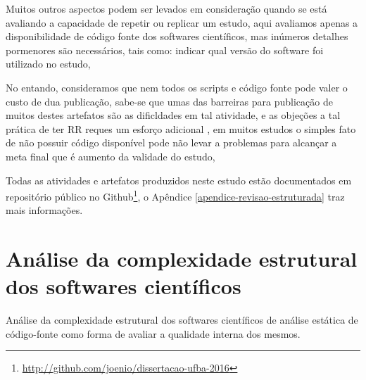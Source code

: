 
Muitos outros aspectos podem ser levados em consideração quando se está
avaliando a capacidade de repetir ou replicar um estudo, aqui avaliamos apenas
a disponibilidade de código fonte dos softwares científicos, mas inúmeros detalhes
pormenores são necessários, tais como: indicar qual versão do software foi
utilizado no estudo, 

No entando, consideramos que nem todos os scripts e código fonte pode
valer o custo de dua publicação, sabe-se que umas das barreiras para publicação
de muitos destes artefatos são as dificldades em tal atividade,
e as objeções a tal prática de ter RR reques um esforço adicional \cite{madeyski2017would},
em muitos
estudos o simples fato de não possuir código disponível pode não levar
a problemas para alcançar a meta final que é aumento da validade do estudo,


Todas as atividades e artefatos produzidos neste estudo estão documentados em
repositório público no
Github\footnote{\url{http://github.com/joenio/dissertacao-ufba-2016}}, o
Apêndice \ref{apendice-revisao-estruturada} traz mais informações.




\section{Análise da complexidade estrutural dos softwares científicos}

Análise da complexidade estrutural dos softwares científicos de análise
estática de código-fonte como forma de avaliar a qualidade interna dos mesmos.

\label{complexidade-ferramentas}

% 

